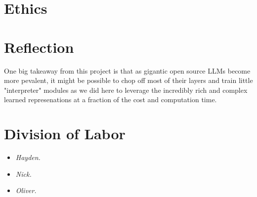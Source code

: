 \documentclass[14pt, twocolumn]{article}
\begin{document}
\section{Ethics}

\section{Reflection}

One big takeaway from this project is that as gigantic open source LLMs become more pevalent, it might be possible to chop off most of their layers and train little "interpreter" modules as we did here to leverage the incredibly rich and complex learned represenations at a fraction of the cost and computation time.

\section{Division of Labor}
\begin{itemize}
    \item \textit{Hayden.}
    \item \textit{Nick.} 
    \item \textit{Oliver.} 
\end{itemize}
\end{document}
